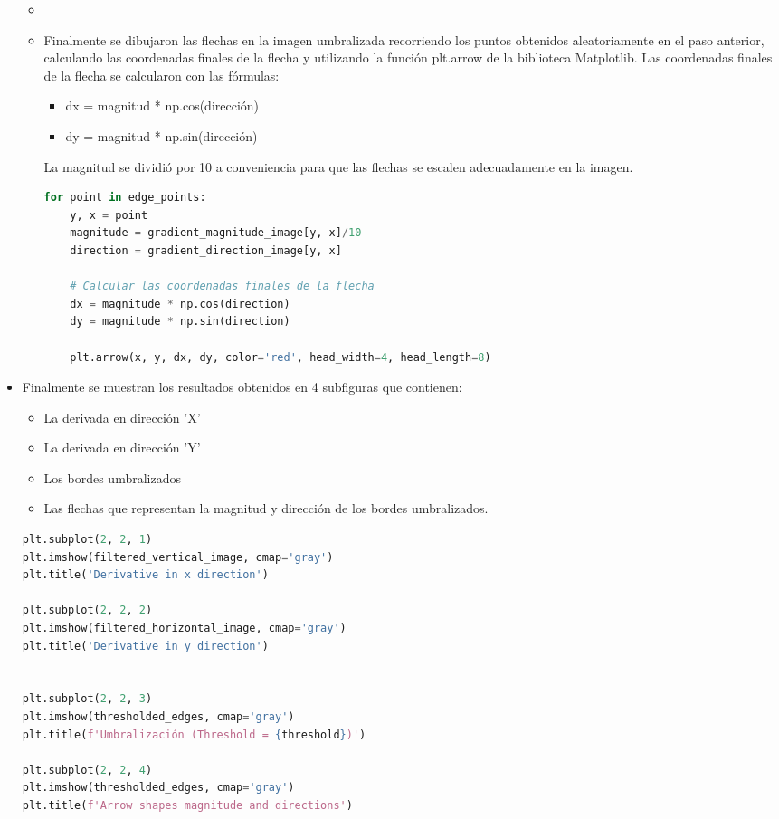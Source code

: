 \documentclass{article}
\begin{document}
\begin{itemize}
\begin{itemize}
            \item
            \item Finalmente se dibujaron las flechas en la imagen umbralizada recorriendo los puntos obtenidos aleatoriamente en el paso anterior,
            calculando las coordenadas finales de la flecha y utilizando la función plt.arrow de la biblioteca Matplotlib.
            Las coordenadas finales de la flecha se calcularon con las fórmulas:
            \begin{itemize}
                \item dx = magnitud * np.cos(dirección)
                \item dy = magnitud * np.sin(dirección)
            \end{itemize}
            La magnitud se dividió por 10 a conveniencia para que las flechas se escalen adecuadamente en la imagen.
            \begin{lstlisting}[language=Python, caption={Implementación edgeDetector - Dibujar flechas},label={lst:edgeDetector6}]
  for point in edge_points:
    y, x = point
    magnitude = gradient_magnitude_image[y, x]/10
    direction = gradient_direction_image[y, x]

    # Calcular las coordenadas finales de la flecha
    dx = magnitude * np.cos(direction)
    dy = magnitude * np.sin(direction)

    plt.arrow(x, y, dx, dy, color='red', head_width=4, head_length=8)
            \end{lstlisting}
        
        \end{itemize}
        
        \clearpage
        \item Finalmente se muestran los resultados obtenidos en 4 subfiguras que contienen:
        \begin{itemize}
            \item La derivada en dirección 'X'
            \item La derivada en dirección 'Y'
            \item Los bordes umbralizados
            \item Las flechas que representan la magnitud y dirección de los bordes umbralizados.
        \end{itemize}
        \begin{lstlisting}[language=Python, caption={Implementación edgeDetector - Mostrar resultados},label={lst:edgeDetector7}]
plt.subplot(2, 2, 1)
plt.imshow(filtered_vertical_image, cmap='gray')
plt.title('Derivative in x direction')

plt.subplot(2, 2, 2)
plt.imshow(filtered_horizontal_image, cmap='gray')
plt.title('Derivative in y direction')


plt.subplot(2, 2, 3)
plt.imshow(thresholded_edges, cmap='gray')
plt.title(f'Umbralización (Threshold = {threshold})')

plt.subplot(2, 2, 4)
plt.imshow(thresholded_edges, cmap='gray')
plt.title(f'Arrow shapes magnitude and directions')
        
        \end{lstlisting}
    \end{itemize}
    
\end{document}
